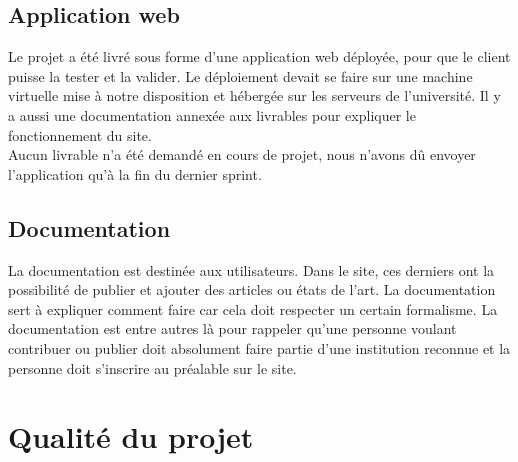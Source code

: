 \documentclass[t, 12pt, usenames,dvipsnames]{article}
\begin{document}
        \subsection{Application web}
            \noindent Le projet a été livré sous forme d'une application web déployée, pour que le client puisse la tester et la valider. Le déploiement devait se faire sur une machine virtuelle mise à notre disposition et hébergée sur les serveurs de l'université. Il y a aussi une documentation annexée aux livrables pour expliquer le fonctionnement du site.\\
            Aucun livrable n'a été demandé en cours de projet, nous n'avons dû envoyer l'application qu'à la fin du dernier sprint.
        
        \subsection{Documentation}
            \noindent La documentation est destinée aux utilisateurs. Dans le site, ces derniers ont la possibilité de publier et ajouter des articles ou états de l'art. La documentation sert à expliquer comment faire car cela doit respecter un certain formalisme. La documentation est entre autres là pour rappeler qu'une personne voulant contribuer ou publier doit absolument faire partie d'une institution reconnue et la personne doit s'inscrire au préalable sur le site.

    \section{Qualité du projet}
        
\end{document}
